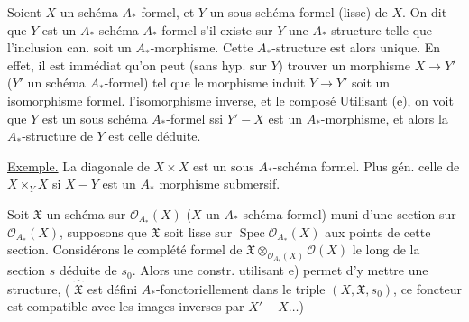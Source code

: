 Soient $X$ un schéma $A_*$-formel, et $Y$ un sous-schéma formel (lisse) de $X$.  On dit que $Y$ est un  $A_*$-schéma $A_*$-formel s'il existe sur $Y$ une $A_*$ structure telle que l'inclusion can. soit un $A_*$-morphisme. Cette $A_*$-structure est alors unique. En effet, il est immédiat qu'on peut (sans hyp. sur $Y$) trouver un  morphisme $X\to Y'$ ($Y'$ un schéma $A_*$-formel) tel que le morphisme induit $Y\to Y'$ soit un isomorphisme formel.  l'isomorphisme inverse, et le composé
Utilisant (e), on  voit que  $Y$ est un sous schéma $A_*$-formel ssi $Y'\mathbin{-}X$ est un $A_*$-morphisme, et alors la $A_*$-structure de $Y$ est celle déduite.

\uline{Exemple.} La diagonale de $X\times X$ est un sous $A_*$-schéma formel. Plus gén. celle de $X\times_Y X$ si $X\mathbin{-}Y$ est un $A_*$ morphisme submersif. 

Soit $\mathfrak X$ un schéma sur $\mathcal O_{A_*}(X)$ ($X$ un $A_*$-schéma formel) muni d'une section  sur $\mathcal O_{A_*}(X)$, supposons que $\mathfrak X$ soit lisse sur $\operatorname{Spec}\mathcal O_{A_*}(X)$ aux points de cette section. Considérons le complété formel  de $\mathfrak X\otimes_{\mathcal O_{A_*}(X)}\mathcal O(X)$ le long de la section $s$ déduite de $s_0$. Alors une constr. utilisant e) permet d'y mettre une  structure,  ( $\hat{\mathfrak X}$ est défini $A_*$-fonctoriellement dans le triple $(X,\mathfrak X,s_0)$, ce foncteur est compatible avec les images inverses par $X'\mathbin{-}X\ldots$)
